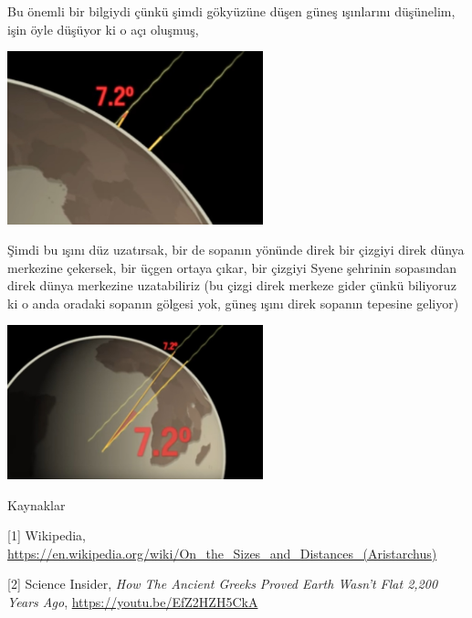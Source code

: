 \documentclass[12pt,fleqn]{article}\usepackage{../../common}
\begin{document}
Bu önemli bir bilgiydi çünkü şimdi gökyüzüne düşen güneş ışınlarını düşünelim,
işin öyle düşüyor ki o açı oluşmuş, 

\includegraphics[width=20em]{circum1.jpg}

Şimdi bu ışını düz uzatırsak, bir de sopanın yönünde direk bir çizgiyi direk
dünya merkezine çekersek, bir üçgen ortaya çıkar, bir çizgiyi Syene şehrinin
sopasından direk dünya merkezine uzatabiliriz (bu çizgi direk merkeze gider
çünkü biliyoruz ki o anda oradaki sopanın gölgesi yok, güneş ışını direk sopanın
tepesine geliyor)

\includegraphics[width=20em]{circum2.jpg}



Kaynaklar

[1] Wikipedia,
    \url{https://en.wikipedia.org/wiki/On_the_Sizes_and_Distances_(Aristarchus)}

[2] Science Insider, {\em How The Ancient Greeks Proved Earth Wasn't Flat 2,200 Years Ago},
    \url{https://youtu.be/EfZ2HZH5CkA}
    
\end{document}
